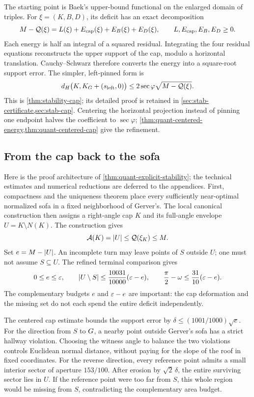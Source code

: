 The starting point is Baek's upper-bound functional on the enlarged domain of
triples. For $\xi=(K,B,D)$, its deficit has an exact decomposition
\[
 M-\mathcal{Q}(\xi)=L(\xi)+E_{\mathrm{cap}}(\xi)+E_B(\xi)+E_D(\xi),
 \qquad L,E_{\mathrm{cap}},E_B,E_D\ge0.
\]
Each energy is half an integral of a squared residual. Integrating the four
residual equations reconstructs the upper support of the cap, modulo a
horizontal translation. Cauchy--Schwarz therefore converts the energy into a
square-root support error. The simpler, left-pinned form is
\[
 d_H\bigl(K,K_G+(s_{\mathrm{left}},0)\bigr)
 \le 2\sec\varphi\sqrt{M-\mathcal{Q}(\xi)}.
\]
This is \cref{thm:stability-cap}; its detailed proof is retained in
\cref{sec:stab-certificate,sec:stab-cap}. Centering the horizontal projection
instead of pinning one endpoint halves the coefficient to $\sec\varphi$;
\cref{thm:quant-centered-energy,thm:quant-centered-cap} give the refinement.

\subsection{From the cap back to the sofa}

Here is the proof architecture of \cref{thm:quant-explicit-stability}; the
technical estimates and numerical reductions are deferred to the appendices.
First, compactness and the uniqueness theorem place every sufficiently
near-optimal normalized sofa in a fixed neighborhood of Gerver's. The local
canonical construction then assigns a right-angle cap $K$ and its full-angle
envelope $U=K\setminus N(K)$. The construction gives
\[
 \mathcal{A}(K)=\lvert U\rvert\le\mathcal{Q}(\xi_K)\le M.
\]
Set $e=M-\lvert U\rvert$. An incomplete turn may leave points of $S$ outside $U$;
one must not assume $S\subseteq U$. The refined terminal comparison gives
\[
 0\le e\le\varepsilon,
 \qquad
 \lvert U\setminus S\rvert\le\frac{10031}{10000}(\varepsilon-e),
 \qquad
 \frac\pi2-\omega\le\frac{31}{10}(\varepsilon-e).
\]
The complementary budgets $e$ and $\varepsilon-e$ are important: the cap deformation
and the missing set do not each spend the entire deficit independently.

The centered cap estimate bounds the support error by
$\delta\le(1001/1000)\sqrt e$. For the direction from $S$ to $G$, a nearby
point outside Gerver's sofa has a strict hallway violation. Choosing the
witness angle to balance the two violations controls Euclidean normal distance,
without paying for the slope of the roof in fixed coordinates. For the reverse
direction, every reference point admits a small interior sector of aperture
$153/100$. After erosion by $\sqrt2\,\delta$, the entire surviving sector
lies in $U$. If the reference point were too far from $S$, this whole region
would be missing from $S$, contradicting the complementary area budget.

